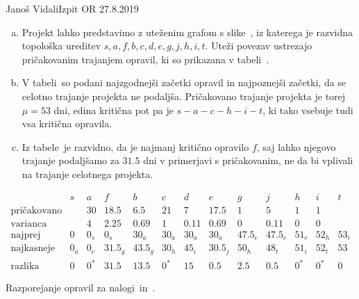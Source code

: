 \begin{naloga}{Janoš Vidali}{Izpit OR 27.8.2019}
\begin{odgovor}
\begin{enumerate}[(a)]
\item Projekt lahko predstavimo z uteženim grafom s slike~\fig,
iz katerega je razvidna topološka ureditev
$s, a, f, b, c, d, e, g, j, h, i, t$.
Uteži povezav ustrezajo pričakovanim trajanjem opravil,
ki so prikazana v tabeli~.

\item V tabeli~
so podani najzgodnejši začetki opravil in najpoznejši začetki,
da se celotno trajanje projekta ne podaljša.
Pričakovano trajanje projekta je torej $\mu = 53$ dni,
edina kritična pot pa je $s - a - c - h - i - t$,
ki tako vsebuje tudi vsa kritična opravila.

\item Iz tabele~ je razvidno,
da je najmanj kritično opravilo $f$,
saj lahko njegovo trajanje
podaljšamo za $31.5$ dni v primerjavi s pričakovanim,
ne da bi vplivali na trajanje celotnega projekta.
\end{enumerate}
%
\begin{slika}
\makebox[\textwidth][c]{
\pgfslika
}
\end{slika}
%
\begin{tabela}
$$
\begin{array}{c|cccccccccccc}
& s & a & f & b & c & d & e & g & j & h & i & t \\ \hline
\text{pričakovano} && 30 & 18.5 & 6.5 & 21 & 7 & 17.5 & 1 & 5 & 1 & 1 \\
\text{varianca} && 4 & 2.25 & 0.69 & 1 & 0.11 & 0.69 & 0 & 0.11 & 0 & 0 \\
\hline
\text{najprej} & 0 & 0_s & 0_s & 30_a & 30_a & 30_a & 30_a & 47.5_e & 47.5_e & 51_c & 52_h & 53_i \\
\text{najkasneje} & 0_a & 0_c & 31.5_g & 43.5_g & 30_h & 45_i & 30.5_j & 50_h & 48_t & 51_i & 52_t & 53 \\
\text{razlika} & 0 & 0^* & 31.5 & 13.5 & 0^* & 15 & 0.5 & 2.5 & 0.5 & 0^* & 0^* & 0
\end{array}
$$
\caption{Razporejanje opravil za nalogi~\nal in~\nal[dirka2].}
\end{tabela}
\end{odgovor}
\end{naloga}
